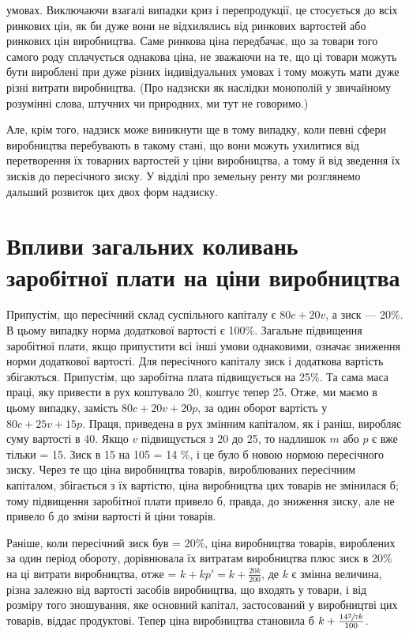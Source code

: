 \parcont{}  %
умовах. Виключаючи взагалі випадки криз і перепродукції, це
стосується до всіх ринкових цін, як би дуже вони не відхилялись
від ринкових вартостей або ринкових цін виробництва.
Саме ринкова ціна передбачає, що за товари того самого роду
сплачується однакова ціна, не зважаючи на те, що ці товари
можуть бути вироблені при дуже різних індивідуальних умовах
і тому можуть мати дуже різні витрати виробництва. (Про надзиски
як наслідки монополій у звичайному розумінні слова, штучних
чи природних, ми тут не говоримо.)

Але, крім того, надзиск може виникнути ще в тому випадку,
коли певні сфери виробництва перебувають в такому стані, що
вони можуть ухилитися від перетворення їх товарних вартостей
у ціни виробництва, а тому й від зведення їх зисків до пересічного
зиску. У відділі про земельну ренту ми розглянемо
дальший розвиток цих двох форм надзиску.

\section{Впливи загальних коливань заробітної плати
на ціни виробництва}

Припустім, що пересічний склад суспільного капіталу є
$80 c + 20 v$, а зиск — 20\%. В цьому випадку норма додаткової
вартості є 100\%. Загальне підвищення заробітної плати, якщо
припустити всі інші умови однаковими, означає зниження норми
додаткової вартості. Для пересічного капіталу зиск і додаткова
вартість збігаються. Припустім, що заробітна плата підвищується
на 25\%. Та сама маса праці, яку привести в рух коштувало 20,
коштує тепер 25. Отже, ми маємо в цьому випадку, замість
$80 c + 20 v + 20 p$, за один оборот вартість у $80 c + 25 v + 15 p$.
Праця, приведена в рух змінним капіталом, як і раніш, виробляє
суму вартості в 40. Якщо $v$ підвищується з 20 до 25, то надлишок
$m$ або $p$ є вже тільки = 15. Зиск в 15 на 105 = 14 \%,
і це було б новою нормою пересічного зиску. Через те що
ціна виробництва товарів, вироблюваних пересічним капіталом,
збігається з їх вартістю, ціна виробництва цих товарів не змінилася
б; тому підвищення заробітної плати привело б, правда,
до зниження зиску, але не привело б до зміни вартості й ціни
товарів.

Раніше, коли пересічний зиск був = 20\%, ціна виробництва
товарів, вироблених за один період обороту, дорівнювала їх
витратам виробництва плюс зиск в 20\% на ці витрати виробництва,
отже = $k + kp' = k + \frac{20k}{200}$, де $k$ є змінна величина, різна
залежно від вартості засобів виробництва, що входять у товари,
і від розміру того зношування, яке основний капітал, застосований
у виробництві цих товарів, віддає продуктові. Тепер
ціна виробництва становила б $k + \frac{14 \sfrac{2}{7} k }{100}$.
